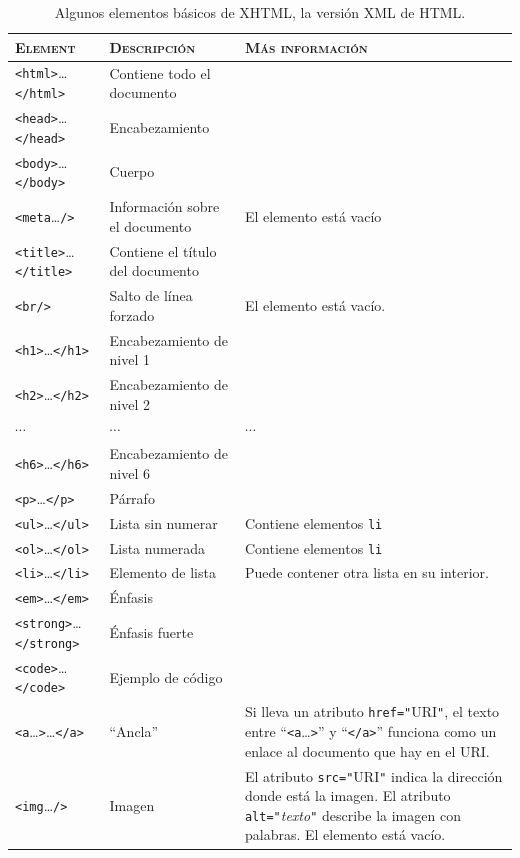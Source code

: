 \begin{table} \begin{center} \begin{tabular}{l|p{3.2cm}|p{4.3cm}} \hline\hline \textsc{Element} &\textsc{Descripción} &\textsc{Más información} \\ \hline

\texttt{<html>}\ldots\texttt{</html>} &Contiene todo el documento &\\ \hline

\texttt{<head>}\ldots\texttt{</head>} &Encabezamiento &\\\hline \texttt{<body>}\ldots\texttt{</body>} &Cuerpo &\\\hline \texttt{<meta}\ldots\texttt{/>} &Información sobre el documento &El elemento está vacío \\\hline \texttt{<title>}\ldots\texttt{</title>} &Contiene el título del documento &\\\hline \texttt{<br/>} &Salto de línea forzado &El elemento está vacío. \\\hline \texttt{<h1>}\ldots\texttt{</h1>} &Encabezamiento de nivel 1 &\\\hline \texttt{<h2>}\ldots\texttt{</h2>} &Encabezamiento de nivel 2 &\\\hline \(\cdots\) &\(\cdots\) &\(\cdots\) \\\hline \texttt{<h6>}\ldots\texttt{</h6>} &Encabezamiento de nivel 6 &\\\hline \texttt{<p>}\ldots\texttt{</p>} &Párrafo &\\\hline \texttt{<ul>}\ldots\texttt{</ul>} &Lista sin numerar &Contiene elementos \texttt{li} \\\hline \texttt{<ol>}\ldots\texttt{</ol>} &Lista numerada &Contiene elementos \texttt{li} \\\hline \texttt{<li>}\ldots\texttt{</li>} &Elemento de lista &Puede contener otra lista en su interior. \\\hline \texttt{<em>}\ldots\texttt{</em>} &Énfasis &\\\hline \texttt{<strong>}\ldots\texttt{</strong>} &Énfasis fuerte &\\\hline \texttt{<code>}\ldots\texttt{</code>} &Ejemplo de código &\\\hline \texttt{<a}\ldots\texttt{>}\ldots\texttt{</a>} &``Ancla'' &Si lleva un atributo \texttt{href="}URI\texttt{"}, el texto entre ``\texttt{<a}\ldots\texttt{>}'' y ``\texttt{</a>}'' funciona como un enlace al documento que hay en el URI.\\\hline \texttt{<img}\ldots\texttt{/>} &Imagen &El atributo \texttt{src="}URI\texttt{"} indica la dirección donde está la imagen. El atributo \texttt{alt="}\emph{texto}\texttt{"} describe la imagen con palabras. El elemento está vacío.\\\hline \end{tabular} \end{center} \caption{Algunos elementos básicos de XHTML, la versión XML de HTML.} \label{tb:15etiq} \end{table} 

